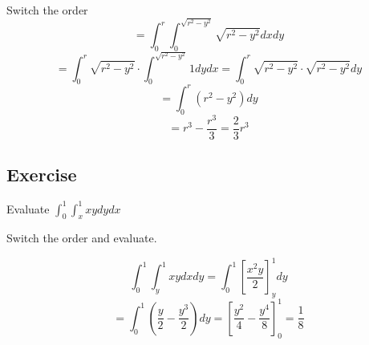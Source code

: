 \documentclass{article}
\begin{document}
Switch the order
\[=\int^r_0\int^{\sqrt{r^2-y^2}}_0 \sqrt{r^2-y^2}dxdy\]
\[=\int^r_0 \sqrt{r^2-y^2}\cdot \int^{\sqrt{r^2-y^2}}_0 1dydx = \int^r_0 \sqrt{r^2-y^2}\cdot\sqrt{r^2-y^2}dy\]
\[=\int^r_0 (r^2-y^2)dy\]
\[=r^3-\frac{r^3}{3}=\frac{2}{3}r^3\]

\subsection*{Exercise}
Evaluate $\int^1_0\int^1_x xydydx$

Switch the order and evaluate.

\[\int^1_0\int^1_y xydxdy =\int^1_0 \left[\frac{x^2 y}{2}\right]^1_y dy\]
\[=\int^1_0 (\frac{y}{2}-\frac{y^3}{2})dy = \left[\frac{y^2}{4}-\frac{y^4}{8}\right]^1_0=\frac{1}{8}\]
\end{document}
